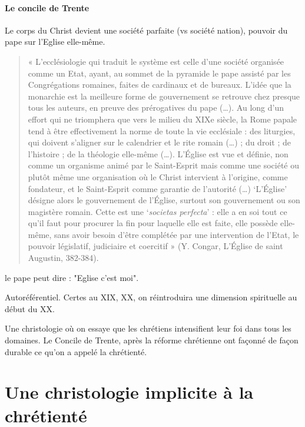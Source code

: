 \paragraph{Le concile de Trente} 

Le corps du Christ devient une société parfaite (vs société nation), pouvoir du pape sur l'Eglise elle-même.

\begin{quote}
    « L’ecclésiologie qui traduit le système est celle d’une société organisée comme un Etat,
ayant, au sommet de la pyramide le pape assisté par les Congrégations romaines, faites de
cardinaux et de bureaux. L’idée que la monarchie est la meilleure forme de gouvernement se
retrouve chez presque tous les auteurs, en preuve des prérogatives du pape (…). Au long d’un
effort qui ne triomphera que vers le milieu du XIXe siècle, la Rome papale tend à être
effectivement la norme de toute la vie ecclésiale : des liturgies, qui doivent s’aligner sur le
calendrier et le rite romain (…) ; du droit ; de l’histoire ; de la théologie elle-même (…).
L’Église est vue et définie, non comme un organisme animé par le Saint-Esprit mais comme
une société ou plutôt même une organisation où le Christ intervient à l’origine, comme
fondateur, et le Saint-Esprit comme garantie de l’autorité (…) ‘L’Église’ désigne alors le
gouvernement de l’Église, surtout son gouvernement ou son magistère romain. Cette est une
‘\textit{societas perfecta}’ : elle a en soi tout ce qu’il faut pour procurer la fin pour laquelle elle est
faite, elle possède elle-même, sans avoir besoin d’être complétée par une intervention de
l’Etat, le pouvoir législatif, judiciaire et coercitif » (Y. Congar, L’Église de saint Augustin,
382-384).
\end{quote}


le pape peut dire : "Eglise c'est moi".

Autoréférentiel.
Certes au XIX, XX, on réintroduira une dimension spirituelle au début du XX.


\begin{Synthesis}
Une christologie où on essaye que les chrétiens intensifient leur foi dans tous les domaines. Le Concile de Trente, après la réforme chrétienne ont façonné de façon durable ce qu'on a appelé la chrétienté. 
\end{Synthesis}

\section{Une christologie implicite à la chrétienté } 

